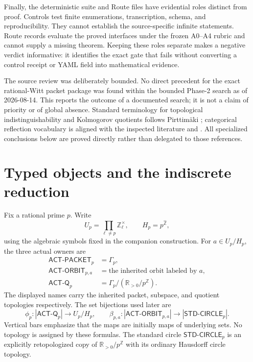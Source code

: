 \documentclass[11pt]{article}
\theoremstyle{definition}
\newcommand{\R}{\mathbb R}
\newcommand{\Z}{\mathbb Z}
\newcommand{\Zhat}{\widehat{\mathbb Z}}
\newcommand{\ACTP}{\mathsf{ACT\mbox{-}PACKET}_p}
\newcommand{\ACTO}{\mathsf{ACT\mbox{-}ORBIT}_{p,a}}
\newcommand{\ACTQ}{\mathsf{ACT\mbox{-}Q}_p}
\newcommand{\STDC}{\mathsf{STD\mbox{-}CIRCLE}_p}
\begin{document}
Finally, the deterministic suite and Route files have evidential roles distinct from proof.  Controls test finite enumerations, transcription, schema, and reproducibility.  They cannot establish the source-specific infinite statements.  Route records evaluate the proved interfaces under the frozen A0--A4 rubric and cannot supply a missing theorem.  Keeping these roles separate makes a negative verdict informative: it identifies the exact gate that fails without converting a control receipt or YAML field into mathematical evidence.

The source review was deliberately bounded.  No direct precedent for the exact rational-Witt packet package was found within the bounded Phase-2 search as of 2026-08-14.  This reports the outcome of a documented search; it is not a claim of priority or of global absence.  Standard terminology for topological indistinguishability and Kolmogorov quotients follows Pirttim\"aki \cite[physical pp.~4--6, 9, 12--13]{Pirttimaki2021}; categorical reflection vocabulary is aligned with the inspected literature \cite[physical pp.~3--4 of the author preprint]{CagliariMantovani2003} and \cite[arXiv-v2 physical pp.~2--6]{HernandezArzusaHernandez2020}.  All specialized conclusions below are proved directly rather than delegated to those references.

\section{Typed objects and the indiscrete reduction}
\label{sec:typed}

Fix a rational prime $p$.  Write
\[
 U_p=\prod_{\ell\ne p}\Z_\ell^{\times},\qquad H_p=p^{\Zhat},
\]
using the algebraic symbols fixed in the companion construction.  For $a\in U_p/H_p$, the three actual owners are
\begin{align*}
 \ACTP&=\Gamma_p,\\
 \ACTO&=\text{the inherited orbit labeled by }a,\\
 \ACTQ&=\Gamma_p/(\R_{>0}/p^{\Z}).
\end{align*}
The displayed names carry the inherited packet, subspace, and quotient topologies respectively.  The set bijections used later are
\[
 \phi_p:|\ACTQ|\longrightarrow U_p/H_p,
 \qquad
 \beta_{p,a}:|\ACTO|\longrightarrow|\STDC|.
\]
Vertical bars emphasize that the maps are initially maps of underlying sets.  No topology is assigned by these formulas.  The standard circle $\STDC$ is an explicitly retopologized copy of $\R_{>0}/p^{\Z}$ with its ordinary Hausdorff circle topology.
\end{document}
